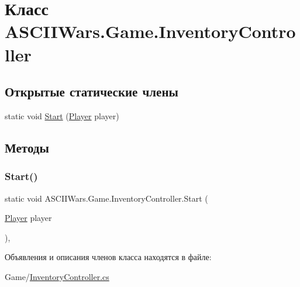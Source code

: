\hypertarget{class_a_s_c_i_i_wars_1_1_game_1_1_inventory_controller}{}\section{Класс A\+S\+C\+I\+I\+Wars.\+Game.\+Inventory\+Controller}
\label{class_a_s_c_i_i_wars_1_1_game_1_1_inventory_controller}
\subsection*{Открытые статические члены}
\begin{DoxyCompactItemize}
\item 
static void \hyperlink{class_a_s_c_i_i_wars_1_1_game_1_1_inventory_controller_a7cf0556bdbb8dd155a09050d81110f1e}{Start} (\hyperlink{class_a_s_c_i_i_wars_1_1_game_1_1_player}{Player} player)
\end{DoxyCompactItemize}


\subsection{Методы}
\hypertarget{class_a_s_c_i_i_wars_1_1_game_1_1_inventory_controller_a7cf0556bdbb8dd155a09050d81110f1e}{}\label{class_a_s_c_i_i_wars_1_1_game_1_1_inventory_controller_a7cf0556bdbb8dd155a09050d81110f1e} 
\subsubsection{\texorpdfstring{Start()}{Start()}}
{\footnotesize\ttfamily static void A\+S\+C\+I\+I\+Wars.\+Game.\+Inventory\+Controller.\+Start (\begin{DoxyParamCaption}\item[{\hyperlink{class_a_s_c_i_i_wars_1_1_game_1_1_player}{Player}}]{player }\end{DoxyParamCaption})\hspace{0.3cm}{\ttfamily [inline]}, {\ttfamily [static]}}



Объявления и описания членов класса находятся в файле\+:\begin{DoxyCompactItemize}
\item 
Game/\hyperlink{_inventory_controller_8cs}{Inventory\+Controller.\+cs}\end{DoxyCompactItemize}
